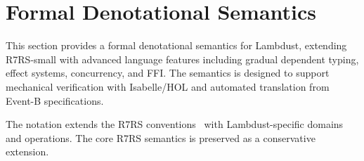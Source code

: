 \chapter{Formal Denotational Semantics}
\label{ch:formal-semantics}

\bgroup




This section provides a formal denotational semantics for Lambdust, extending R7RS-small with advanced language features including gradual dependent typing, effect systems, concurrency, and FFI. The semantics is designed to support mechanical verification with Isabelle/HOL and automated translation from Event-B specifications.

The notation extends the R7RS conventions~\cite{R7RS} with Lambdust-specific domains and operations. The core R7RS semantics is preserved as a conservative extension.

